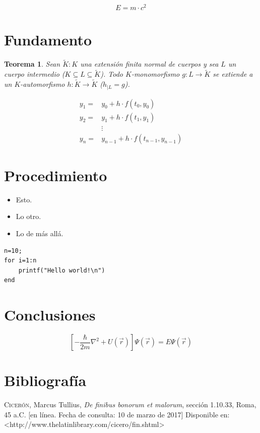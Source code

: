 \documentclass[titlepage,a4paper]{article}
\newtheorem{thm}{Teorema}
\theoremstyle{definition}
\theoremstyle{remark}
\begin{document}
\lipsum[1-1] %

\begin{equation}
E=m \cdot c^2
\end{equation}

\section{Fundamento}

\lipsum[2-2]

\begin{thm}
Sean $\tilde{K}:K$ una extensión finita normal de cuerpos y sea $L$ un cuerpo intermedio ($K\subseteq L\subseteq \tilde{K}$). Todo $K$-monomorfismo $g:L\longrightarrow \tilde{K}$ se extiende a un $K$-automorfismo $h:\tilde{K}\longrightarrow\tilde{K}$ ($h_{\mid L}=g$).
\end{thm}

\lipsum[3-3]

\begin{equation}
\begin{split}
y_{1}=&y_{0}+h\cdot f(t_{0},y_{0}) \\
y_{2}=&y_{1}+h\cdot f(t_{1},y_{1}) \\
	  &\vdots \\
y_{n}=&y_{n-1}+h\cdot f(t_{n-1},y_{n-1})
\end{split}
\end{equation}

\section{Procedimiento}

\lipsum[4-4]

\begin{itemize}
\item Esto.
\item Lo otro.
\item Lo de más allá.
\end{itemize}

\begin{lstlisting}[title=hello\_world.m]
n=10;
for i=1:n
	printf("Hello world!\n")
end
\end{lstlisting}

\section{Conclusiones}

\lipsum[5-5]

\begin{equation}
\left[-\frac{\hbar}{2m}\nabla^2 + U(\vec{r}) \right]\Psi(\vec{r}) = E\Psi(\vec{r})
\end{equation}

\section{Bibliografía}

\indent

\leftskip 0.3in
\parindent -0.3in

\textsc{Cicerón}, Marcus Tullius, \textit{De finibus bonorum et malorum}, sección 1.10.33, Roma, 45 a.C. [en línea. Fecha de consulta: 10 de marzo de 2017] Disponible en: <http://www.thelatinlibrary.com/cicero/fin.shtml> 
\end{document}
